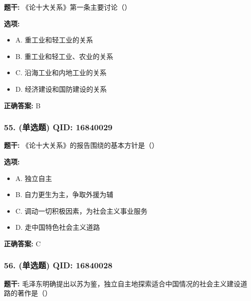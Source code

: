 \documentclass[12pt,UTF8]{ctexart}
\begin{document}
\textbf{题干:}
《论十大关系》第一条主要讨论（）

\textbf{选项:}
\begin{itemize}[leftmargin=*]

  \item A. 重工业和轻工业的关系

  \item B. 重工业和轻工业、农业的关系

  \item C. 沿海工业和内地工业的关系

  \item D. 经济建设和国防建设的关系

\end{itemize}

\textbf{正确答案:}
B

\vspace{0.3em}\hrulefill\vspace{0.7em}

\subsubsection*{55. (单选题) \small QID: 16840029}

\textbf{题干:}
《论十大关系》的报告围绕的基本方针是（）

\textbf{选项:}
\begin{itemize}[leftmargin=*]

  \item A. 独立自主

  \item B. 自力更生为主，争取外援为辅

  \item C. 调动一切积极因素，为社会主义事业服务

  \item D. 走中国特色社会主义道路

\end{itemize}

\textbf{正确答案:}
C

\vspace{0.3em}\hrulefill\vspace{0.7em}

\subsubsection*{56. (单选题) \small QID: 16840028}

\textbf{题干:}
毛泽东明确提出以苏为鉴，独立自主地探索适合中国情况的社会主义建设道路的著作是（）
\end{document}
